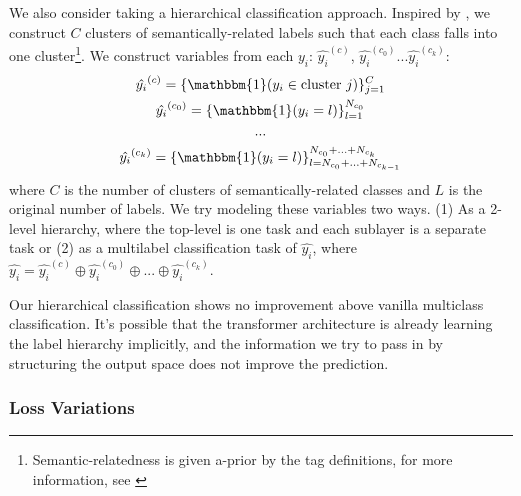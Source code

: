 \documentclass[11pt]{article}
\begin{document}
We also consider taking a hierarchical classification approach. Inspired by \cite{silva2017improving}, we construct $C$ clusters of semantically-related labels such that each class falls into one cluster\footnote{Semantic-relatedness is given a-prior by the tag definitions, for more information, see \cite{yarlott2018identifying, choubey-etal-2020-discourse}}. We construct variables from each $y_i$: $\hat{y_i}^{(c)}$,  $\hat{y_i}^{(c_0)}...\hat{y_i}^{(c_k)}$:
\begin{gather*}
    \hat{y_i}^{(c)} = \{\mathbbm{1}(y_i \in  \text{cluster } j)\}_{j=1}^C\\
    \hat{y_i}^{(c_0)} = \{\mathbbm{1}(y_i = l)\}_{l=1}^{N_{c_0}}\\
    ...\\
    \hat{y_i}^{(c_k)} = \{\mathbbm{1}(y_i = l)\}_{l=N_{c_0}+...+N_{c_{k-1}}}^{N_{c_0} + ... + N_{c_k}}
\end{gather*}
where $C$ is the number of clusters of semantically-related classes and $L$ is the original number of labels. We try modeling these variables two ways. (1) As a 2-level hierarchy, where the top-level is one task and each sublayer is a separate task or (2) as a multilabel classification task of $\hat{y_i}$, where $\hat{y_i} = \hat{y_i}^{(c)} \oplus \hat{y_i}^{(c_0)} \oplus ... \oplus \hat{y_i}^{(c_k)}$. 

Our hierarchical classification shows no improvement above vanilla multiclass classification. It's possible that the transformer architecture is already learning the label hierarchy implicitly, and the information we try to pass in by structuring the output space does not improve the prediction.

\subsubsection{Loss Variations}
\label{app:Loss Variations}
\end{document}
